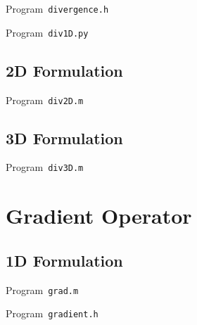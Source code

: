 \begin{listing}[ht!]
	\tiny
	\centering
	\caption{Program~\texttt{divergence.h}}
	\label{code:divergence.h}
\end{listing}

\begin{listing}[ht!]
	\tiny
	\centering
	\caption{Program~\texttt{div1D.py}}
	\label{code:div1D.py}
\end{listing}

\subsection{2D Formulation}

\begin{listing}[ht!]
	\tiny
	\centering
	\caption{Program~\texttt{div2D.m}}
	\label{code:div2D.m}
\end{listing}

\subsection{3D Formulation}

\begin{listing}[ht!]
	\tiny
	\centering
	\caption{Program~\texttt{div3D.m}}
	\label{code:div3D.m}
\end{listing}

\section{Gradient Operator}

\subsection{1D Formulation}

\begin{listing}[ht!]
	\tiny
	\centering
	\caption{Program~\texttt{grad.m}}
	\label{code:grad.m}
\end{listing}

\begin{listing}[ht!]
	\tiny
	\centering
	\caption{Program~\texttt{gradient.h}}
	\label{code:gradient.h}
\end{listing}

